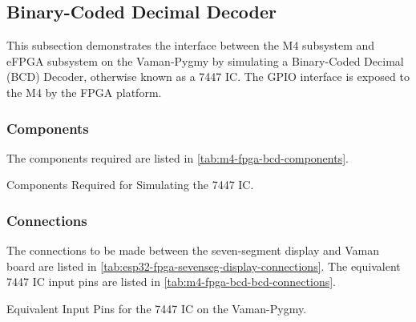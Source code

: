 \subsection{Binary-Coded Decimal Decoder}
This subsection demonstrates the interface between the M4 subsystem and eFPGA
subsystem on the Vaman-Pygmy by simulating a Binary-Coded Decimal (BCD) Decoder,
otherwise known as a 7447 IC. The GPIO interface is exposed to the M4 by the
FPGA platform.

\subsubsection{Components}
The components required are listed in \autoref{tab:m4-fpga-bcd-components}.
\begin{table}[!ht]
    \centering
    
    \caption{Components Required for Simulating the 7447 IC.}
    \label{tab:m4-fpga-bcd-components}
\end{table}

\subsubsection{Connections}
The connections to be made between the seven-segment display and Vaman board are
listed in \autoref{tab:esp32-fpga-sevenseg-display-connections}. The equivalent
7447 IC input pins are listed in \autoref{tab:m4-fpga-bcd-bcd-connections}.

\begin{table}[!ht]
    \centering
    
    \caption{Equivalent Input Pins for the 7447 IC on the Vaman-Pygmy.}
    \label{tab:m4-fpga-bcd-bcd-connections}
\end{table}

